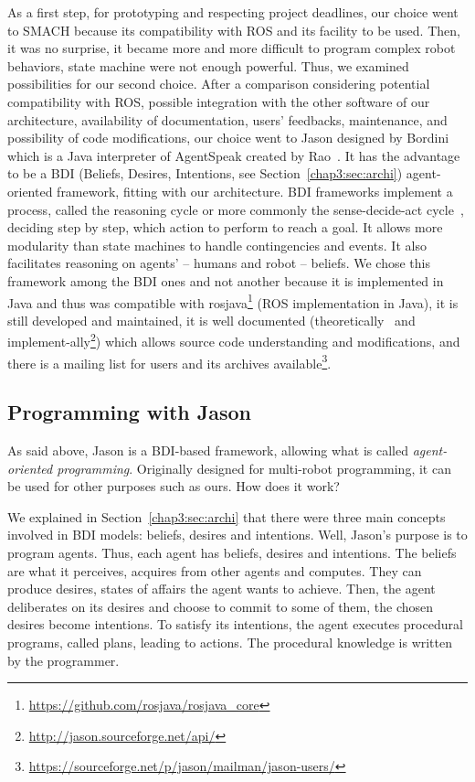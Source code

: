 \documentclass[a4paper,11pt,twoside]{StyleThese}
\begin{document}
As a first step, for prototyping and respecting project deadlines, our choice went to SMACH because its compatibility with ROS and its facility to be used. Then, it was no surprise, it became more and more difficult to program complex robot behaviors, state machine were not enough powerful. Thus, we examined possibilities for our second choice. After a comparison considering potential compatibility with ROS, possible integration with the other software of our architecture, availability of documentation, users' feedbacks, maintenance, and possibility of code modifications, our choice went to Jason designed by Bordini \etal~\cite{bordini_2007_jason} which is a Java interpreter of AgentSpeak created by Rao~\cite{rao_1996_agentspeak}. It has the advantage to be a BDI (Beliefs, Desires, Intentions, see Section~\ref{chap3:sec:archi}) agent-oriented framework, fitting with our architecture. BDI frameworks implement a process, called the reasoning cycle or more commonly the sense-decide-act cycle~\cite{albus_1991_outline}, deciding step by step, which action to perform to reach a goal. It allows more modularity than state machines to handle contingencies and events. It also facilitates reasoning on agents' -- humans and robot -- beliefs. We chose this framework among the BDI ones and not another because it is implemented in Java and thus was compatible with rosjava\footnote{\url{https://github.com/rosjava/rosjava_core}} (\ie ROS implementation in Java), it is still developed and maintained, it is well documented (theoretically~\cite{bordini_2007_jason} and implement-ally\footnote{\url{http://jason.sourceforge.net/api/}}) which allows source code understanding and modifications, and there is a mailing list for users and its archives available\footnote{\url{https://sourceforge.net/p/jason/mailman/jason-users/}}.

\subsection{Programming with Jason}\label{chap4:subsec:jason}
As said above, Jason is a BDI-based framework, allowing what is called \textit{agent-oriented programming}. Originally designed for multi-robot programming, it can be used for other purposes such as ours. How does it work?

We explained in Section~\ref{chap3:sec:archi} that there were three main concepts involved in BDI models: beliefs, desires and intentions. Well, Jason's purpose is to program agents. Thus, each agent has beliefs, desires and intentions. The beliefs are what it perceives, acquires from other agents and computes. They can produce desires, \ie states of affairs the agent wants to achieve. Then, the agent deliberates on its desires and choose to commit to some of them, \ie the chosen desires become intentions. To satisfy its intentions, the agent executes procedural programs, called plans, leading to actions. The procedural knowledge is written by the programmer.
\end{document}
